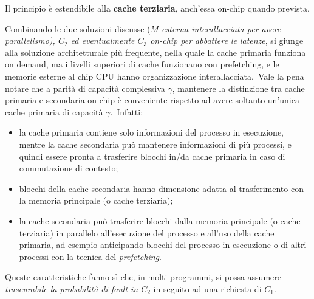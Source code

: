 Il principio è estendibile alla \textbf{cache terziaria}, anch'essa on-chip quando prevista.

Combinando le due soluzioni discusse (\textit{$M$ esterna interallacciata per avere parallelismo), $C_2$ ed eventualmente $C_3$ on-chip per abbattere le latenze}, si giunge alla soluzione architetturale più frequente, nella quale la cache primaria funziona on demand, ma i livelli superiori di cache funzionano con prefetching, e le memorie esterne al chip CPU hanno organizzazione interallacciata.\
Vale la pena notare che a parità di capacità complessiva $\gamma$, mantenere la distinzione tra cache primaria e  secondaria on-chip è conveniente rispetto ad avere soltanto un'unica cache primaria di capacità $\gamma$.\
Infatti:

\begin{itemize}
    \item la cache primaria contiene solo informazioni del processo in esecuzione, mentre la cache secondaria può mantenere informazioni di più processi, e quindi essere pronta a trasferire blocchi in/da cache primaria in caso di commutazione di contesto;
    \item blocchi della cache secondaria hanno dimensione adatta al trasferimento con la memoria principale (o cache terziaria);
    \item la cache secondaria può trasferire blocchi dalla memoria principale (o cache terziaria) in parallelo all'esecuzione del processo e all'uso della cache primaria, ad esempio anticipando blocchi del processo in esecuzione o di altri processi con la tecnica del \textit{prefetching}.
\end{itemize}

\noindent Queste caratteristiche fanno sì che, in molti programmi, si possa assumere \textit{trascurabile la probabilità di fault in $C_2$} in seguito ad una richiesta di $C_1$.

